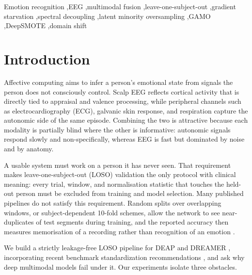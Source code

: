 \documentclass[a4paper,fleqn]{cas-sc}
\begin{document}
\begin{keywords}
Emotion recognition \sep EEG \sep multimodal fusion \sep leave-one-subject-out \sep gradient starvation \sep spectral decoupling \sep latent minority oversampling \sep GAMO \sep DeepSMOTE \sep domain shift
\end{keywords}

\maketitle

\section{Introduction}
\label{sec:intro}

Affective computing aims to infer a person's emotional state from signals the person does not consciously control. Scalp EEG reflects cortical activity that is directly tied to appraisal and valence processing, while peripheral channels such as electrocardiography (ECG), galvanic skin response, and respiration capture the autonomic side of the same episode. Combining the two is attractive because each modality is partially blind where the other is informative: autonomic signals respond slowly and non-specifically, whereas EEG is fast but dominated by noise and by anatomy.

A usable system must work on a person it has never seen. That requirement makes leave-one-subject-out (LOSO) validation the only protocol with clinical meaning: every trial, window, and normalisation statistic that touches the held-out person must be excluded from training and model selection. Many published pipelines do not satisfy this requirement. Random splits over overlapping windows, or subject-dependent 10-fold schemes, allow the network to see near-duplicates of test segments during training, and the reported accuracy then measures memorisation of a recording rather than recognition of an emotion \citep{li2022tutorial}.

We build a strictly leakage-free LOSO pipeline for DEAP \citep{koelstra2012deap} and DREAMER \citep{katsigiannis2018dreamer}, incorporating recent benchmark standardization recommendations \citep{torres2023survey,zhang2023multimodal}, and ask why deep multimodal models fail under it. Our experiments isolate three obstacles.
\end{document}
